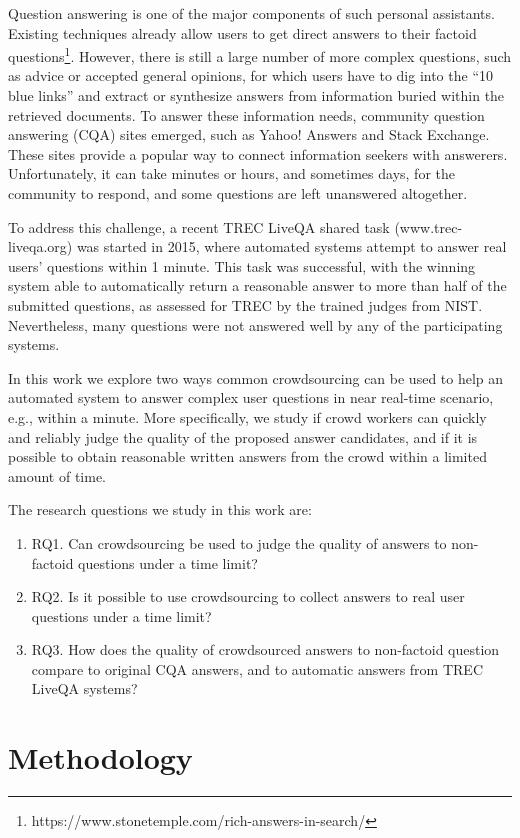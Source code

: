\documentclass[11pt,letterpaper]{article}
\begin{document}
Question answering is one of the major components of such personal assistants.
Existing techniques already allow users to get direct answers to their factoid questions\footnote{https://www.stonetemple.com/rich-answers-in-search/}.
However, there is still a large number of more complex questions, such as advice or accepted general opinions, for which users have to dig into the ``10 blue links'' and extract or synthesize answers from information buried within the retrieved documents.
To answer these information needs, community question answering (CQA) sites emerged, such as Yahoo! Answers and Stack Exchange.
These sites provide a popular way to connect information seekers with answerers.
Unfortunately, it can take minutes or hours, and sometimes days, for the community to respond, and some questions are left unanswered altogether. 

To address this challenge, a recent TREC LiveQA shared task (www.trec-liveqa.org) was started in 2015, where automated systems attempt to answer real users' questions within 1 minute.
This task was successful, with the winning system able to automatically return a reasonable answer to more than half of the submitted questions, as assessed for TREC by the trained judges from NIST.
Nevertheless, many questions were not answered well by any of the participating systems.

In this work we explore two ways common crowdsourcing can be used to help an automated system to answer complex user questions in near real-time scenario, e.g., within a minute.
More specifically, we study if crowd workers can quickly and reliably judge the quality of the proposed answer candidates, and if it is possible to obtain reasonable written answers from the crowd within a limited amount of time.

The research questions we study in this work are:
\begin{enumerate}
\item RQ1. Can crowdsourcing be used to judge the quality of answers to non-factoid questions under a time limit?
\item RQ2. Is it possible to use crowdsourcing to collect answers to real user questions under a time limit?
\item RQ3. How does the quality of crowdsourced answers to non-factoid question compare to original CQA answers, and to automatic answers from TREC LiveQA systems?
\end{enumerate}


\section{Methodology}
\label{sec:methodology}
\end{document}
